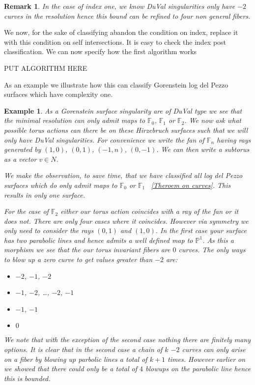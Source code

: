 \documentclass[11pt]{amsart}
\theoremstyle{plain}
\newtheorem{ex}[thm]{Example}
\newtheorem*{rem}{Remark}
\newcommand{\mb}[1]{\mathbb{#1}}
\begin{document}
\begin{rem}
In the case of index one, we know DuVal singularities only have $-2$ curves in the resolution hence this bound can be refined to four non general fibers.
\end{rem}
We now, for the sake of classifying abandon the condition on index, replace it with this condition on self intersections. It is easy to check the index post classification.
We can now specify how the first algorithm works


PUT ALGORITHM HERE


As an example we illustrate how this can classify Gorenstein log del Pezzo surfaces which have complexity one.

\begin{ex}
As a Gorenstein surface singularity are of DuVal type we see that the minimal resolution can only admit maps to $\mb{F}_0$, $\mb{F}_1$ or $\mb{F}_2$. We now ask what possible torus actions can there be on these Hirzebruch surfaces such that we will only have DuVal singularities. For convenience we write the fan of $\mb{F}_n$ having rays generated by $(1,0)$, $(0,1)$, $(-1, n)$, $(0,-1)$. We can then write a subtorus as a vector $v \in N$.


We make the observation, to save time, that we have classified all log del Pezzo surfaces which do only admit maps to $\mb{F}_0$ or $\mb{F}_1$ ~\ref{Theroem on curves}. This results in only one surface.


For the case of $\mb{F}_2$ either our torus action coincides with a ray of the fan or it does not. There are only four cases where it coincides. However via symmetry we only need to consider the rays $(0,1)$ and $(1,0)$. In the first case your surface has two parabolic lines and hence admits a well defined map to $\mb{P}^1$. As this a morphism we see that the our torus invariant fibers are $0$ curves. The only ways to blow up a zero curve to get values greater than $-2$ are:
\begin{itemize}
\item $-2$, $-1$, $-2$
\item $-1$, $-2$, \dots , $-2$, $-1$
\item $-1$, $-1$
\item $0$
\end{itemize}
We note that with the exception of the second case nothing there are finitely many options. It is clear that in the second case a chain of $k$ $-2$ curves can only arise on a fiber by blowing up parbolic lines a total of $k+1$ times. However earlier on we showed that there could only be a total of $4$ blowups on the parabolic line hence this is bounded.  



\end{ex}
\end{document}
